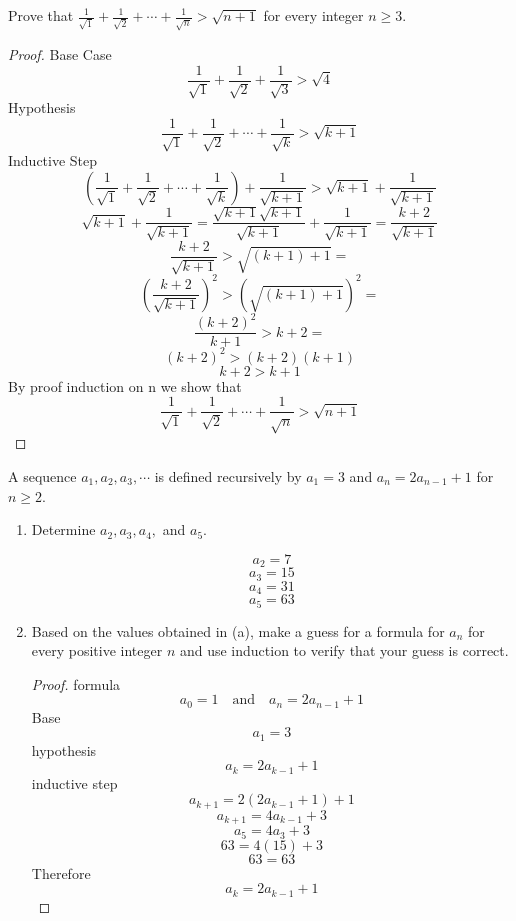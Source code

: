 \documentclass{homework}
\begin{document}
\question Prove that $\frac{1}{\sqrt{1}} + \frac{1}{\sqrt{2}} + \cdots + \frac{1}{\sqrt{n}} > \sqrt{n+1} $ for every integer $n\geq 3$.

\begin{sol}
	\begin{proof}
		Base Case
		\[
			\frac{1}{\sqrt{1}} + \frac{1}{\sqrt{2}} + \frac{1}{\sqrt{3}} > \sqrt{4}
		\]
		Hypothesis
		\[
			\frac{1}{\sqrt{1}} + \frac{1}{\sqrt{2}} + \cdots + \frac{1}{\sqrt{k}} > \sqrt{k+1}
		\]
		Inductive Step
		\[
			(\frac{1}{\sqrt{1}} + \frac{1}{\sqrt{2}} + \cdots + \frac{1}{\sqrt{k}}) + \frac{1}{\sqrt{k+1}} > \sqrt{k+1} + \frac{1}{\sqrt{k+1}}
		\]
		\[
		\sqrt{k+1} + \frac{1}{\sqrt{k+1}} = \frac{\sqrt{k+1}\sqrt{k+1}}{\sqrt{k+1}} + \frac{1}{\sqrt{k+1}} = \frac{k+2}{\sqrt{k+1}}
		\]
		\bigbreak
		\[
			\frac{k+2}{\sqrt{k+1}} > \sqrt{(k+1)+1} = 
		\]
		\[
			(\frac{k+2}{\sqrt{k+1}})^2 > (\sqrt{(k+1)+1} )^2 =
		\]
		\[
			\frac{(k+2)^2}{k+1} > k+2 =
		\]
		\[
			(k+2)^2 > (k+2)(k+1)
		\]
		\[
			k+2>k+1
		\]
		By proof induction on n we show that
		\[
			\frac{1}{\sqrt{1}} + \frac{1}{\sqrt{2}} + \cdots + \frac{1}{\sqrt{n}} > \sqrt{n+1} 
		\]
	\end{proof}
\end{sol}

\question A sequence $a_{1}, a_{2}, a_{3},\cdots$ is defined recursively by $a_{1} = 3$ and $a_{n} = 2a_{n-1} + 1$ for $n\geq 2$.
\begin{enumerate}[label=(\alph*)]
	\item Determine $a_{2}, a_{3}, a_{4},$ and $a_{5}$.
	\begin{sol}
		\[a_2 = 7\]
		\[a_3 = 15\]
		\[a_4 = 31\]
		\[a_5 = 63\]
	\end{sol}
	\item Based on the values obtained in (a), make a guess for a formula for $a_{n}$ for every positive integer $n$ and use induction to verify that your guess is correct.
	\begin{sol}
		\begin{proof}
			formula
		    \[
				a_{0} = 1 \quad \text{and} \quad a_{n} = 2a_{n-1} + 1
			\]
			Base
			\[
				a_{1} = 3
			\]
			hypothesis
			\[
				a_k = 2a_{k-1}+1
			\]
			inductive step
			\[
				a_{k+1} = 2(2a_{k-1}+1) + 1
			\]
			\[
				a_{k+1} = 4a_{k-1}+3
			\]	
			\[
				a_5 = 4a_3 + 3
			\]
			\[
				63 = 4(15) + 3
			\]
			\[
				63 = 63
			\]
			Therefore
			\[
				a_k = 2a_{k-1}+1
			\]
		\end{proof}
	\end{sol}
\end{enumerate}
\end{document}
